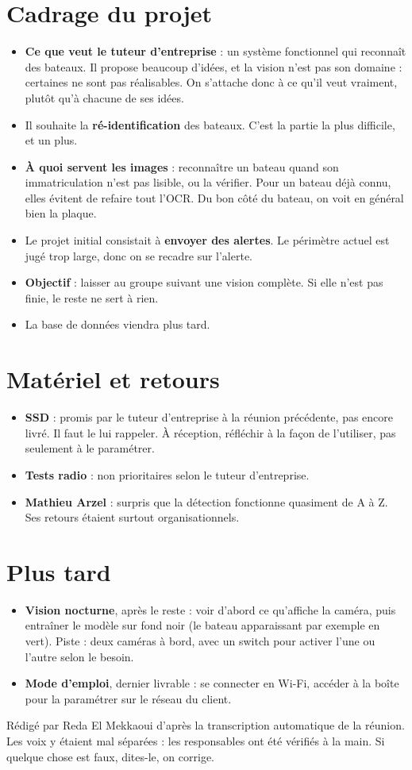 \documentclass[10pt,a4paper]{article}
\begin{document}
\newpage

\section{Cadrage du projet}
\begin{itemize}
  \item \textbf{Ce que veut le tuteur d'entreprise} : un système fonctionnel qui reconnaît des bateaux. Il propose beaucoup d'idées, et la vision n'est pas son domaine : certaines ne sont pas réalisables. On s'attache donc à ce qu'il veut vraiment, plutôt qu'à chacune de ses idées.
  \item Il souhaite la \textbf{ré-identification} des bateaux. C'est la partie la plus difficile, et un plus.
  \item \textbf{À quoi servent les images} : reconnaître un bateau quand son immatriculation n'est pas lisible, ou la vérifier. Pour un bateau déjà connu, elles évitent de refaire tout l'OCR. Du bon côté du bateau, on voit en général bien la plaque.
  \item Le projet initial consistait à \textbf{envoyer des alertes}. Le périmètre actuel est jugé trop large, donc on se recadre sur l'alerte.
  \item \textbf{Objectif} : laisser au groupe suivant une vision complète. Si elle n'est pas finie, le reste ne sert à rien.
  \item La base de données viendra plus tard.
\end{itemize}

\section{Matériel et retours}
\begin{itemize}
  \item \textbf{SSD} : promis par le tuteur d'entreprise à la réunion précédente, pas encore livré. Il faut le lui rappeler. À réception, réfléchir à la façon de l'utiliser, pas seulement à le paramétrer.
  \item \textbf{Tests radio} : non prioritaires selon le tuteur d'entreprise.
  \item \textbf{Mathieu Arzel} : surpris que la détection fonctionne quasiment de A à Z. Ses retours étaient surtout organisationnels.
\end{itemize}

\section{Plus tard}
\begin{itemize}
  \item \textbf{Vision nocturne}, après le reste : voir d'abord ce qu'affiche la caméra, puis entraîner le modèle sur fond noir (le bateau apparaissant par exemple en vert). Piste : deux caméras à bord, avec un switch pour activer l'une ou l'autre selon le besoin.
  \item \textbf{Mode d'emploi}, dernier livrable : se connecter en Wi-Fi, accéder à la boîte pour la paramétrer sur le réseau du client.
\end{itemize}

\vfill
{\footnotesize\color{muted} Rédigé par Reda El Mekkaoui d'après la transcription automatique de la réunion. Les voix y étaient mal séparées : les responsables ont été vérifiés à la main. Si quelque chose est faux, dites-le, on corrige.\par}
\end{document}
